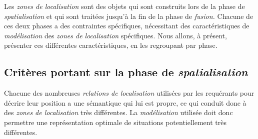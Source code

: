 Les \emph{zones de localisation} sont des objets qui sont construits
lors de la phase de \emph{spatialisation} et qui sont traitées jusqu'à
la fin de la phase de \emph{fusion.} Chacune de ces deux phases a des
contraintes spécifiques, nécessitant des caractéristiques de
\emph{modélisation} des \emph{zones de localisation} spécifiques.
Nous allons, à présent, présenter ces différentes caractéristiques, en
les regroupant par phase.

\subsection{Critères portant sur la phase de \emph{spatialisation}}

Chacune des nombreuses \emph{relations de localisation} utilisées par
les requérants pour décrire leur position a une sémantique qui lui est
propre, ce qui conduit donc à des \emph{zones de localisation} très
différentes. La \emph{modélisation} utilisée doit donc permettre une
représentation optimale de situations potentiellement très
différentes.

